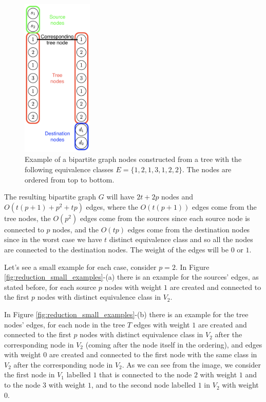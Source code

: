 \begin{figure}[H]
    \centering
    \includegraphics[width=0.3\textwidth]{Immagini/bipartite_keys_part.png}
    \caption[Bipartite nodes structure]{Example of a bipartite graph nodes constructed from a tree with the following equivalence classes $E = \{1,2,1,3,1,2,2\}$. The nodes are ordered from top to bottom.}
    \label{fig:reduction_example_parts}
\end{figure}

\begin{definition}
    The resulting bipartite graph $G$ will have $2t + 2p$ nodes and $O(t (p + 1) + p^2 + tp)$ edges, where the $O(t (p + 1))$ edges come from the tree nodes, the $O(p^2)$ edges come from the sources since each source node is connected to $p$ nodes, and the $O(tp)$ edges come from the destination nodes since in the worst case we have $t$ distinct equivalence class and so all the nodes are connected to the destination nodes. The weight of the edges will be $0$ or $1$.
\end{definition}

Let's see a small example for each case, consider $p=2$. In Figure \ref{fig:reduction_small_examples}-(a) there is an example for the sources' edges, as stated before, for each source $p$ nodes with weight $1$ are created and connected to the first $p$ nodes with distinct equivalence class in $V_2$.

In Figure \ref{fig:reduction_small_examples}-(b) there is an example for the tree nodes' edges, for each node in the tree $T$ edges with weight $1$ are created and connected to the first $p$ nodes with distinct equivalence class in $V_2$ after the corresponding node in $V_2$ (coming after the node itself in the ordering), and edges with weight $0$ are created and connected to the first node with the same class in $V_2$ after the corresponding node in $V_2$. As we can see from the image, we consider the first node in $V_1$ labelled $1$ that is connected to the node $2$ with weight $1$ and to the node $3$ with weight $1$, and to the second node labelled $1$ in $V_2$ with weight $0$.


